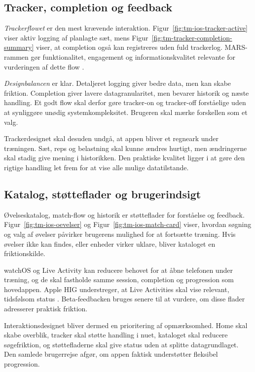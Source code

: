 \subsection{Tracker, completion og feedback}

\emph{Trackerflowet} er den mest krævende interaktion. Figur~\ref{fig:tm-ios-tracker-active} viser aktiv logging af planlagte sæt, mens Figur~\ref{fig:tm-tracker-completion-summary} viser, at completion også kan registreres uden fuld trackerlog. MARS-rammen gør funktionalitet, engagement og informationskvalitet relevante for vurderingen af dette flow \cite{stoyanov2015_mobile_app_rating_scale}.

\emph{Designbalancen} er klar. Detaljeret logging giver bedre data, men kan skabe friktion. Completion giver lavere datagranularitet, men bevarer historik og næste handling. Et godt flow skal derfor gøre tracker-on og tracker-off forståelige uden at synliggøre unødig systemkompleksitet. Brugeren skal mærke forskellen som et valg.

Trackerdesignet skal desuden undgå, at appen bliver et regneark under træningen. Sæt, reps og belastning skal kunne ændres hurtigt, men ændringerne skal stadig give mening i historikken. Den praktiske kvalitet ligger i at gøre den rigtige handling let frem for at vise alle mulige datatilstande.

\subsection{Katalog, støtteflader og brugerindsigt}

Øvelseskatalog, match-flow og historik er støtteflader for forståelse og feedback. Figur~\ref{fig:tm-ios-oevelser} og Figur~\ref{fig:tm-ios-match-card} viser, hvordan søgning og valg af øvelser påvirker brugerens mulighed for at fortsætte træning. Hvis øvelser ikke kan findes, eller enheder virker uklare, bliver kataloget en friktionskilde.

watchOS og Live Activity kan reducere behovet for at åbne telefonen under træning, og de skal fastholde samme session, completion og progression som hovedappen. Apple HIG understreger, at Live Activities skal vise relevant, tidsfølsom status \cite{apple_hig_live_activities}. Beta-feedbacken bruges senere til at vurdere, om disse flader adresserer praktisk friktion.

Interaktionsdesignet bliver dermed en prioritering af opmærksomhed. Home skal skabe overblik, tracker skal støtte handling i nuet, kataloget skal reducere søgefriktion, og støttefladerne skal give status uden at splitte datagrundlaget. Den samlede brugerrejse afgør, om appen faktisk understøtter fleksibel progression.

